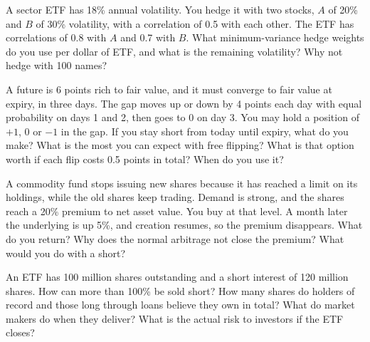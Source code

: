 \begin{question}\label{iq:iv2:etfs-futures-and-index-arbitrage:29}
A sector ETF has 18\% annual volatility. You hedge it with two stocks, $A$ of 20\% and $B$ of 30\% volatility, with a correlation of 0.5 with each other. The ETF has correlations of 0.8 with $A$ and 0.7 with $B$. What minimum-variance hedge weights do you use per dollar of ETF, and what is the remaining volatility? Why not hedge with 100 names?
\end{question}

\begin{question}\label{iq:iv2:etfs-futures-and-index-arbitrage:30}
A future is 6 points rich to fair value, and it must converge to fair value at expiry, in three days. The gap moves up or down by 4 points each day with equal probability on days 1 and 2, then goes to 0 on day 3. You may hold a position of $+1$, $0$ or $-1$ in the gap. If you stay short from today until expiry, what do you make? What is the most you can expect with free flipping? What is that option worth if each flip costs 0.5 points in total? When do you use it?
\end{question}

\begin{question}\label{iq:iv2:etfs-futures-and-index-arbitrage:31}
A commodity fund stops issuing new shares because it has reached a limit on its holdings, while the old shares keep trading. Demand is strong, and the shares reach a 20\% premium to net asset value. You buy at that level. A month later the underlying is up 5\%, and creation resumes, so the premium disappears. What do you return? Why does the normal arbitrage not close the premium? What would you do with a short?
\end{question}

\begin{question}\label{iq:iv2:etfs-futures-and-index-arbitrage:32}
An ETF has 100 million shares outstanding and a short interest of 120 million shares. How can more than 100\% be sold short? How many shares do holders of record and those long through loans believe they own in total? What do market makers do when they deliver? What is the actual risk to investors if the ETF closes?
\end{question}

